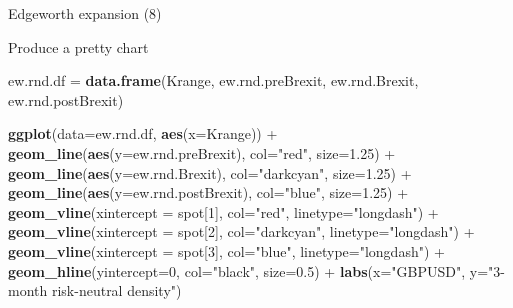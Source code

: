 \documentclass[ignorenonframetext,aspectratio=169]{beamer}
\newenvironment{Shaded}{}{}
\newcommand{\KeywordTok}[1]{\textcolor[rgb]{0.00,0.44,0.13}{\textbf{#1}}}
\newcommand{\DataTypeTok}[1]{\textcolor[rgb]{0.56,0.13,0.00}{#1}}
\newcommand{\DecValTok}[1]{\textcolor[rgb]{0.25,0.63,0.44}{#1}}
\newcommand{\FloatTok}[1]{\textcolor[rgb]{0.25,0.63,0.44}{#1}}
\newcommand{\StringTok}[1]{\textcolor[rgb]{0.25,0.44,0.63}{#1}}
\newcommand{\OperatorTok}[1]{\textcolor[rgb]{0.40,0.40,0.40}{#1}}
\newcommand{\NormalTok}[1]{#1}
\begin{document}
\begin{frame}[fragile]{Edgeworth expansion (8)}

Produce a pretty chart

\begin{Shaded}
\begin{Highlighting}[]
\NormalTok{ew.rnd.df =}\StringTok{ }\KeywordTok{data.frame}\NormalTok{(Krange, ew.rnd.preBrexit, }
\NormalTok{                       ew.rnd.Brexit, ew.rnd.postBrexit)}

\KeywordTok{ggplot}\NormalTok{(}\DataTypeTok{data=}\NormalTok{ew.rnd.df, }\KeywordTok{aes}\NormalTok{(}\DataTypeTok{x=}\NormalTok{Krange)) }\OperatorTok{+}\StringTok{ }
\StringTok{  }\KeywordTok{geom_line}\NormalTok{(}\KeywordTok{aes}\NormalTok{(}\DataTypeTok{y=}\NormalTok{ew.rnd.preBrexit), }\DataTypeTok{col=}\StringTok{"red"}\NormalTok{, }\DataTypeTok{size=}\FloatTok{1.25}\NormalTok{) }\OperatorTok{+}
\StringTok{  }\KeywordTok{geom_line}\NormalTok{(}\KeywordTok{aes}\NormalTok{(}\DataTypeTok{y=}\NormalTok{ew.rnd.Brexit), }\DataTypeTok{col=}\StringTok{"darkcyan"}\NormalTok{, }\DataTypeTok{size=}\FloatTok{1.25}\NormalTok{) }\OperatorTok{+}
\StringTok{  }\KeywordTok{geom_line}\NormalTok{(}\KeywordTok{aes}\NormalTok{(}\DataTypeTok{y=}\NormalTok{ew.rnd.postBrexit), }\DataTypeTok{col=}\StringTok{"blue"}\NormalTok{, }\DataTypeTok{size=}\FloatTok{1.25}\NormalTok{) }\OperatorTok{+}
\StringTok{  }\KeywordTok{geom_vline}\NormalTok{(}\DataTypeTok{xintercept =}\NormalTok{ spot[}\DecValTok{1}\NormalTok{], }\DataTypeTok{col=}\StringTok{"red"}\NormalTok{, }\DataTypeTok{linetype=}\StringTok{"longdash"}\NormalTok{) }\OperatorTok{+}\StringTok{ }
\StringTok{  }\KeywordTok{geom_vline}\NormalTok{(}\DataTypeTok{xintercept =}\NormalTok{ spot[}\DecValTok{2}\NormalTok{], }\DataTypeTok{col=}\StringTok{"darkcyan"}\NormalTok{, }\DataTypeTok{linetype=}\StringTok{"longdash"}\NormalTok{) }\OperatorTok{+}
\StringTok{  }\KeywordTok{geom_vline}\NormalTok{(}\DataTypeTok{xintercept =}\NormalTok{ spot[}\DecValTok{3}\NormalTok{], }\DataTypeTok{col=}\StringTok{"blue"}\NormalTok{, }\DataTypeTok{linetype=}\StringTok{"longdash"}\NormalTok{) }\OperatorTok{+}
\StringTok{  }\KeywordTok{geom_hline}\NormalTok{(}\DataTypeTok{yintercept=}\DecValTok{0}\NormalTok{, }\DataTypeTok{col=}\StringTok{"black"}\NormalTok{, }\DataTypeTok{size=}\FloatTok{0.5}\NormalTok{) }\OperatorTok{+}
\StringTok{  }\KeywordTok{labs}\NormalTok{(}\DataTypeTok{x=}\StringTok{"GBPUSD"}\NormalTok{, }\DataTypeTok{y=}\StringTok{"3-month risk-neutral density"}\NormalTok{) }
\end{Highlighting}
\end{Shaded}

\end{frame}
\end{document}
